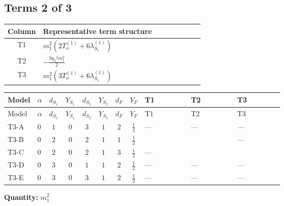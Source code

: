 \documentclass[8pt]{article}
\begin{document}
\begin{landscape}
\subsection*{Terms 2 of 3}
\begin{center}
\begin{tabular}{@{}c >{\raggedright\arraybackslash}p{0.82\linewidth}@{}}
\toprule
Column & Representative term structure \\
\midrule
T1 & \(\displaystyle {m_1^2} (2 T_{\nu}^{(1)}+6 {\lambda_{S_1}^{(1)}})\) \\
\midrule
T2 & \(\displaystyle -\frac{9 {g_2}^2 {m_1^2}}{2}\) \\
\midrule
T3 & \(\displaystyle {m_1^2} (3 T_{\nu}^{(1)}+6 {\lambda_{S_1}^{(1)}})\) \\
\midrule
\bottomrule
\end{tabular}
\end{center}
\smallskip
\tiny
\begin{longtable}{@{}llcccccc >{\raggedright\arraybackslash}p{0.21\linewidth} >{\raggedright\arraybackslash}p{0.21\linewidth} >{\raggedright\arraybackslash}p{0.21\linewidth}@{}}
\toprule
Model & $\alpha$ & $d_{S_1}$ & $Y_{S_1}$ & $d_{S_2}$ & $Y_{S_2}$ & $d_F$ & $Y_F$ & T1 & T2 & T3 \\
\midrule
\endfirsthead
\toprule
Model & $\alpha$ & $d_{S_1}$ & $Y_{S_1}$ & $d_{S_2}$ & $Y_{S_2}$ & $d_F$ & $Y_F$ & T1 & T2 & T3 \\
\midrule
\endhead
T3-A & $0$ & $1$ & $0$ & $3$ & $1$ & $2$ & $\frac{1}{2}$ & --- & --- & --- \\
\midrule
T3-B & $0$ & $2$ & $0$ & $2$ & $1$ & $1$ & $\frac{1}{2}$ & \scriptsize\adjustbox{max width=\linewidth}{$\begin{gathered} {m_1^2} (2 T_{\nu}^{(1)}+6 {\lambda_{S_1}^{(1)}})\end{gathered}$} & \scriptsize\adjustbox{max width=\linewidth}{$\begin{gathered} -\frac{9 {g_2}^2 {m_1^2}}{2}\end{gathered}$} & --- \\
\midrule
T3-C & $0$ & $2$ & $0$ & $2$ & $1$ & $3$ & $\frac{1}{2}$ & --- & \scriptsize\adjustbox{max width=\linewidth}{$\begin{gathered} -\frac{9 {g_2}^2 {m_1^2}}{2}\end{gathered}$} & \scriptsize\adjustbox{max width=\linewidth}{$\begin{gathered} {m_1^2} (3 T_{\nu}^{(1)}+6 {\lambda_{S_1}^{(1)}})\end{gathered}$} \\
\midrule
T3-D & $0$ & $3$ & $0$ & $1$ & $1$ & $2$ & $\frac{1}{2}$ & --- & --- & --- \\
\midrule
T3-E & $0$ & $3$ & $0$ & $3$ & $1$ & $2$ & $\frac{1}{2}$ & --- & --- & --- \\
\midrule
\bottomrule
\end{longtable}
\clearpage
\noindent\textbf{Quantity: }$m_1^2$\par\smallskip

\end{landscape}
\end{document}

